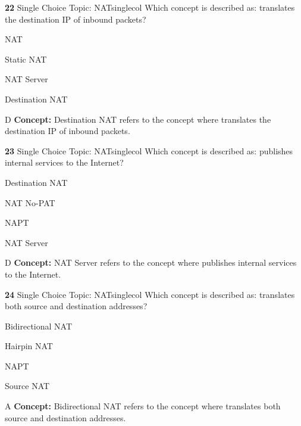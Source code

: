 \documentclass[10pt,a4paper]{article}
\begin{document}
\begin{qcard}{\color{white}\textbf{22} \hfill \small Single Choice \textbar{} Topic: NAT}{singlecol}
Which concept is described as: translates the destination IP of inbound packets?

\begin{qoptions}
\item NAT
\item Static NAT
\item NAT Server
\item Destination NAT
\end{qoptions}
\begin{explainbox}{D}
\textbf{Concept:} Destination NAT refers to the concept where translates the destination IP of inbound packets.
\end{explainbox}
\end{qcard}

\begin{qcard}{\color{white}\textbf{23} \hfill \small Single Choice \textbar{} Topic: NAT}{singlecol}
Which concept is described as: publishes internal services to the Internet?

\begin{qoptions}
\item Destination NAT
\item NAT No-PAT
\item NAPT
\item NAT Server
\end{qoptions}
\begin{explainbox}{D}
\textbf{Concept:} NAT Server refers to the concept where publishes internal services to the Internet.
\end{explainbox}
\end{qcard}

\begin{qcard}{\color{white}\textbf{24} \hfill \small Single Choice \textbar{} Topic: NAT}{singlecol}
Which concept is described as: translates both source and destination addresses?

\begin{qoptions}
\item Bidirectional NAT
\item Hairpin NAT
\item NAPT
\item Source NAT
\end{qoptions}
\begin{explainbox}{A}
\textbf{Concept:} Bidirectional NAT refers to the concept where translates both source and destination addresses.
\end{explainbox}
\end{qcard}
\end{document}
